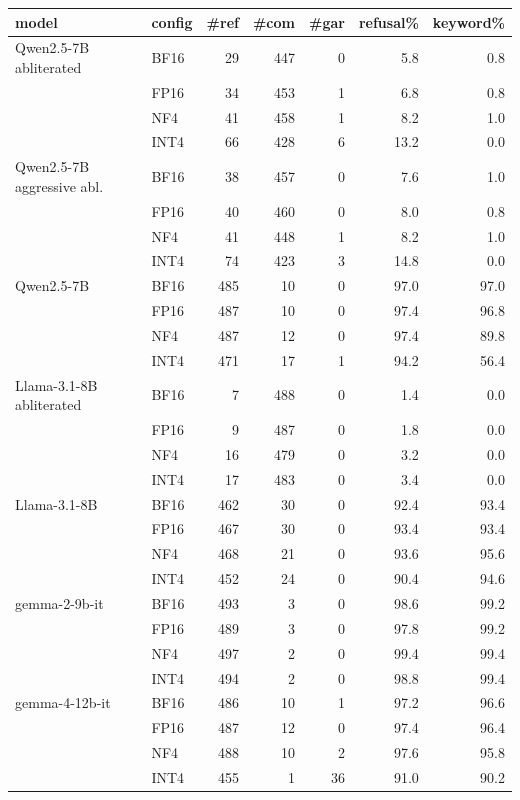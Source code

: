 \setlength{\tabcolsep}{3.5pt}
\begin{tabular}{@{}l l r r r r r@{}}
\toprule
model & config & \#ref & \#com & \#gar & refusal\% & keyword\% \\
\midrule
Qwen2.5-7B abliterated & BF16 & 29 & 447 & 0 & 5.8 & 0.8 \\
 & FP16 & 34 & 453 & 1 & 6.8 & 0.8 \\
 & NF4 & 41 & 458 & 1 & 8.2 & 1.0 \\
 & INT4 & 66 & 428 & 6 & 13.2 & 0.0 \\
\addlinespace
Qwen2.5-7B aggressive abl. & BF16 & 38 & 457 & 0 & 7.6 & 1.0 \\
 & FP16 & 40 & 460 & 0 & 8.0 & 0.8 \\
 & NF4 & 41 & 448 & 1 & 8.2 & 1.0 \\
 & INT4 & 74 & 423 & 3 & 14.8 & 0.0 \\
\addlinespace
Qwen2.5-7B & BF16 & 485 & 10 & 0 & 97.0 & 97.0 \\
 & FP16 & 487 & 10 & 0 & 97.4 & 96.8 \\
 & NF4 & 487 & 12 & 0 & 97.4 & 89.8 \\
 & INT4 & 471 & 17 & 1 & 94.2 & 56.4 \\
\addlinespace
Llama-3.1-8B abliterated & BF16 & 7 & 488 & 0 & 1.4 & 0.0 \\
 & FP16 & 9 & 487 & 0 & 1.8 & 0.0 \\
 & NF4 & 16 & 479 & 0 & 3.2 & 0.0 \\
 & INT4 & 17 & 483 & 0 & 3.4 & 0.0 \\
\addlinespace
Llama-3.1-8B & BF16 & 462 & 30 & 0 & 92.4 & 93.4 \\
 & FP16 & 467 & 30 & 0 & 93.4 & 93.4 \\
 & NF4 & 468 & 21 & 0 & 93.6 & 95.6 \\
 & INT4 & 452 & 24 & 0 & 90.4 & 94.6 \\
\addlinespace
gemma-2-9b-it & BF16 & 493 & 3 & 0 & 98.6 & 99.2 \\
 & FP16 & 489 & 3 & 0 & 97.8 & 99.2 \\
 & NF4 & 497 & 2 & 0 & 99.4 & 99.4 \\
 & INT4 & 494 & 2 & 0 & 98.8 & 99.4 \\
\addlinespace
gemma-4-12b-it & BF16 & 486 & 10 & 1 & 97.2 & 96.6 \\
 & FP16 & 487 & 12 & 0 & 97.4 & 96.4 \\
 & NF4 & 488 & 10 & 2 & 97.6 & 95.8 \\
 & INT4 & 455 & 1 & 36 & 91.0 & 90.2 \\

\end{tabular}
